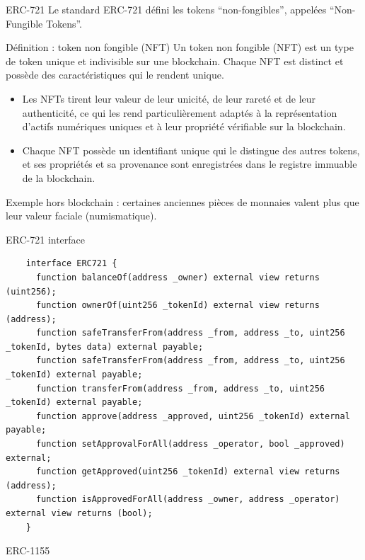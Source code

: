 \begin{frame}{ERC-721}
  Le standard ERC-721 défini les tokens \enquote{non-fongibles}, appelées \enquote{Non-Fungible Tokens}.

  \begin{block}{Définition : token non fongible (NFT)}
    Un token non fongible (NFT) est un type de token unique et indivisible sur une blockchain. Chaque NFT est distinct et possède des caractéristiques qui le rendent unique.

    \begin{itemize}
      \item Les NFTs tirent leur valeur de leur unicité, de leur rareté et de leur authenticité, ce qui les rend particulièrement adaptés à la représentation d'actifs numériques uniques et à leur propriété vérifiable sur la blockchain.
      \item Chaque NFT possède un identifiant unique qui le distingue des autres tokens, et ses propriétés et sa provenance sont enregistrées dans le registre immuable de la blockchain.
    \end{itemize}
  \end{block}

  Exemple hors blockchain : certaines anciennes pièces de monnaies valent plus que leur valeur faciale (numismatique).
\end{frame}

\begin{frame}[fragile]{ERC-721 interface}
  \begin{verbatim}
    interface ERC721 {
      function balanceOf(address _owner) external view returns (uint256);
      function ownerOf(uint256 _tokenId) external view returns (address);
      function safeTransferFrom(address _from, address _to, uint256 _tokenId, bytes data) external payable;
      function safeTransferFrom(address _from, address _to, uint256 _tokenId) external payable;
      function transferFrom(address _from, address _to, uint256 _tokenId) external payable;
      function approve(address _approved, uint256 _tokenId) external payable;
      function setApprovalForAll(address _operator, bool _approved) external;
      function getApproved(uint256 _tokenId) external view returns (address);
      function isApprovedForAll(address _owner, address _operator) external view returns (bool);
    }
  \end{verbatim}
\end{frame}

\begin{frame}{ERC-1155}

\end{frame}